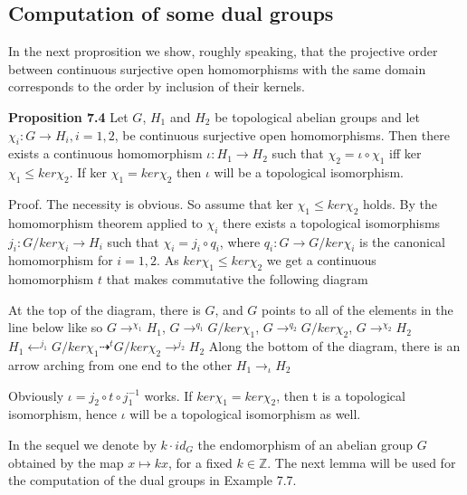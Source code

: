 \documentclass[12pt]{article}
\begin{document}
\subsection{Computation of some dual groups}


In the next proprosition we show, roughly speaking, that the projective order between continuous surjective
open homomorphisms with the same domain corresponds to the order by inclusion of their kernels.


\textbf{Proposition 7.4} Let $G$, $H_1$ and $H_2$ be topological abelian groups and let $\chi_i: G \to H_i, i = 1, 2$, be continuous
surjective open homomorphisms. Then there exists a continuous homomorphism $\iota : H_1 \to H_2$ such that $\chi_2 = \iota \circ \chi_1 $
iff ker $\chi_1 \leq ker \chi_2$. If ker $\chi_1 = ker \chi_2$ then $\iota$ will be a topological isomorphism.


    Proof. The necessity is obvious. So assume that ker $\chi_1 \leq ker \chi_2$ holds. By the homomorphism theorem applied
to $\chi_i$ there exists a topological isomorphisms $j_i: G/ ker \chi_i \to H_i$ such that $\chi_i = j_i \circ q_i$, where $q_i: G \to G/ ker \chi_i$
is the canonical homomorphism for $i = 1, 2$. As $ker \chi_1 \leq ker \chi_2$ we get a continuous homomorphism $t$ that
makes commutative the following diagram

At the top of the diagram, there is $G$, and $G$ points to all of the elements in the line below like so $G \to^{\chi_1} H_1$, $G \to^{q_1} G / ker \chi_1$, $G \to^{q_2} G / ker \chi_2$, $G \to^{\chi_2} H_2$
$H_1 \leftarrow^{j_1} G / ker \chi_1 \dashrightarrow^t G / ker \chi_2 \rightarrow^{j_2} H_2$
Along the bottom of the diagram, there is an arrow arching from one end to the other $H_1 \to_\iota H_2$


Obviously $\iota = j_2 \circ t \circ j^{-1}_1$ works. If $ker \chi_1 = ker \chi_2$, then t is a topological isomorphism, hence $\iota$ will be a
topological isomorphism as well.


    In the sequel we denote by $k · id_G$ the endomorphism of an abelian group $G$ obtained by the map $x \mapsto kx$,
for a fixed $k \in \mathbb{Z}$. The next lemma will be used for the computation of the dual groups in Example 7.7.
\end{document}
